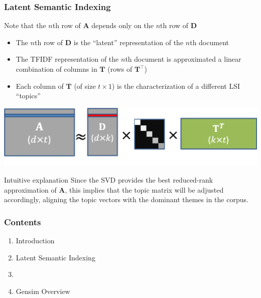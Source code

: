 \documentclass{beamer}
\begin{document}
\begin{frame}
    \frametitle{Latent Semantic Indexing}
    
Note that the $n$th row of ${\mathbf A}$ depends only on the $n$th row of ${\mathbf D}$

\begin{itemize}
    \item The $n$th row of ${\mathbf D}$ is the ``latent'' representation of the $n$th document
    \item The TFIDF representation of the $n$th document is approximated a linear combination of columns in ${\mathbf T}$ (rows of ${\mathbf T}^\top$)
    \item Each column of ${\mathbf T}$ (of size $t \times 1$) is the characterization of a different LSI ``topics''
\end{itemize}

\centerline{\includegraphics[width=.8\textwidth]{./figs/SVD_k3.png}}

\begin{block}{Intuitive explanation}
Since the SVD provides the best reduced-rank approximation of $\mathbf A$, this implies that the topic matrix will be adjusted accordingly, aligning the topic vectors with the dominant themes in the corpus.
\end{block}

\end{frame}


\begin{frame}

    \frametitle{Contents}

	\large

    \begin{enumerate}
  
    	\item Introduction
    	\item Latent Semantic Indexing
    	\item {\bf \color{blue}{Latent Dirichlet Allocation}}
    	\item Gensim Overview
    
    \end{enumerate}

\end{frame}
\end{document}
